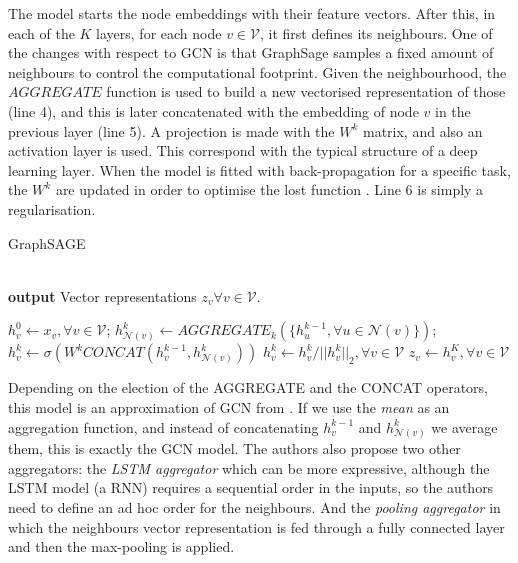 \documentclass[smallextended]{svjour3}
\begin{document}
\begin{appendices}
		The model starts the node embeddings with their feature vectors. After this, in each of the $K$ layers, for each node $v \in \mathcal{V}$, it first defines its neighbours. One of the changes with respect to GCN is that GraphSage samples a fixed amount of neighbours to control the computational footprint. Given the neighbourhood, the $AGGREGATE$ function is used to build a new vectorised representation of those (line 4), and this is later concatenated with the embedding of node $v$ in the previous layer (line 5). A projection is made with the $W^k$ matrix, and also an activation layer is used. This correspond with the typical structure of a deep learning layer. When the model is fitted with back-propagation for a specific task, the $W^k$ are updated in order to optimise the lost function \cite{kelley_gradient_1960}. Line 6 is simply a regularisation.
		
		\begin{algorithm}[!t]
			\caption{GraphSAGE \cite{hamilton_inductive_2017}}
			\label{alg:graphsage}
			\\
			\hspace*{\algorithmicindent}  \textbf{output}  Vector representations $z_v \forall v \in \mathcal{V}$.
			\begin{algorithmic}[1]
				
				\State $h_v^0 \leftarrow x_v, \forall v \in \mathcal{V}$;
				\State $h_{\mathcal{N}(v)}^k \leftarrow AGGREGATE_k(\{h_u^{k-1},\forall u \in \mathcal{N}(v)\})$;
				\State $h_v^k \leftarrow \sigma(W^k CONCAT(h_v^{k-1}, h_{\mathcal{N}(v)}^k))$
				\EndFor
				\State  $h_v^k \leftarrow h_v^k/||h_v^k||_2, \forall v \in \mathcal{V}$
				\EndFor
				\State $z_v \leftarrow h_v^K, \forall v \in \mathcal{V}$		
			\end{algorithmic}
		\end{algorithm}
		
		Depending on the election of the AGGREGATE and the CONCAT operators, this model is an approximation of GCN from \cite{kipf_semi-supervised_2017}. If we use the \textit{mean} as an aggregation function, and instead of concatenating $h_v^{k-1}$ and $h_{\mathcal{N}(v)}^k$ we average them, this is exactly the GCN model. The authors also propose two other aggregators: the \textit{LSTM aggregator} which can be more expressive, although the LSTM model (a RNN) requires a sequential order in the inputs, so the authors need to define an ad hoc order for the neighbours. And the \textit{pooling aggregator} in which the neighbours vector representation is fed through a fully connected layer and then the max-pooling is applied.
		

\end{appendices}
\end{document}

